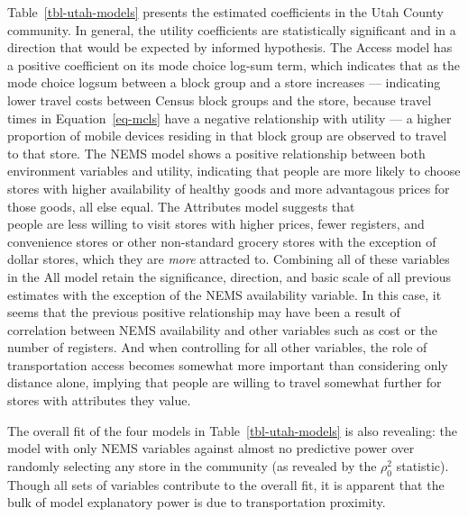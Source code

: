 \documentclass[
  letterpaper,
  DIV=11,
  numbers=noendperiod]{scrreport}
\begin{document}
Table~\ref{tbl-utah-models} presents the estimated coefficients in the
Utah County community. In general, the utility coefficients are
statistically significant and in a direction that would be expected by
informed hypothesis. The Access model has a positive coefficient on its
mode choice log-sum term, which indicates that as the mode choice logsum
between a block group and a store increases --- indicating lower travel
costs between Census block groups and the store, because travel times in
Equation~\ref{eq-mcls} have a negative relationship with utility --- a
higher proportion of mobile devices residing in that block group are
observed to travel to that store. The NEMS model shows a positive
relationship between both environment variables and utility, indicating
that people are more likely to choose stores with higher availability of
healthy goods and more advantagous prices for those goods, all else
equal. The Attributes model suggests that\\
people are less willing to visit stores with higher prices, fewer
registers, and convenience stores or other non-standard grocery stores
with the exception of dollar stores, which they are \emph{more}
attracted to. Combining all of these variables in the All model retain
the significance, direction, and basic scale of all previous estimates
with the exception of the NEMS availability variable. In this case, it
seems that the previous positive relationship may have been a result of
correlation between NEMS availability and other variables such as cost
or the number of registers. And when controlling for all other
variables, the role of transportation access becomes somewhat more
important than considering only distance alone, implying that people are
willing to travel somewhat further for stores with attributes they
value.

The overall fit of the four models in Table~\ref{tbl-utah-models} is
also revealing: the model with only NEMS variables against almost no
predictive power over randomly selecting any store in the community (as
revealed by the \(\rho_0^2\) statistic). Though all sets of variables
contribute to the overall fit, it is apparent that the bulk of model
explanatory power is due to transportation proximity.
\end{document}
